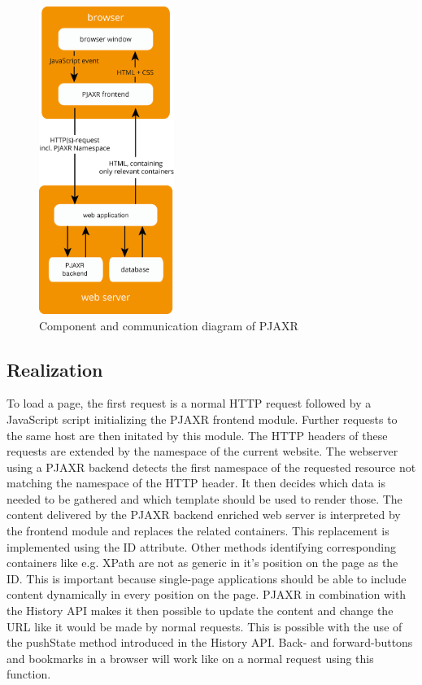 \documentclass[f,bachelor,binding,twoside,palatino]{WeSTthesis}
\def \pjaxr {PJAXR}
\def \httpRequest {HTTP request}
\def \singlePageApplication {single-page application}
\begin{document}
\begin{figure}[H]
\centering
\includegraphics[height=10cm]{images/pjaxr.png}
\caption[pjaxr_components]{Component and communication diagram of \pjaxr{}}
\end{figure}

\subsection{Realization}
To load a page, the first request is a normal \httpRequest{} followed by a JavaScript script initializing the \pjaxr{} frontend module.
Further requests to the same host are then initated by this module.
The HTTP headers of these requests are extended by the namespace of the current website.
The webserver using a \pjaxr{} backend detects the first namespace of the requested resource not matching the namespace of the HTTP header.
It then decides which data is needed to be gathered and which template should be used to render those.
The content delivered by the \pjaxr{} backend enriched web server is interpreted by the frontend module and replaces the related containers.
This replacement is implemented using the ID attribute.
Other methods identifying corresponding containers like e.g. XPath are not as generic in it's position on the page as the ID.
This is important because \singlePageApplication{}s should be able to include content dynamically in every position on the page.
\pjaxr{} in combination with the History API makes it then possible to update the content and change the URL like it would be made by normal requests.
This is possible with the use of the pushState method introduced in the History API.
Back- and forward-buttons and bookmarks in a browser will work like on a normal request using this function.
\end{document}
